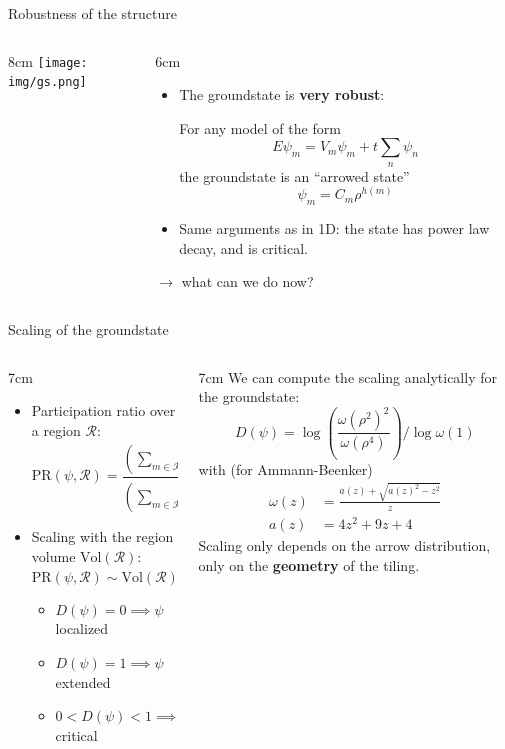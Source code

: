 \documentclass[xcolor=x11names,compress,professionalfonts, aspectratio=169]{beamer}
\renewcommand{\(}{\begin{columns}}
\renewcommand{\)}{\end{columns}}
\newcommand{\<}[1]{\begin{column}{#1}}
\renewcommand{\>}{\end{column}}
\begin{document}
\begin{frame}{Robustness of the structure}

\begin{columns}
\<{8cm}
\texttt{[image: img/gs.png]}
\>
\<{6cm}
\begin{itemize}
\item The groundstate is \textbf{very robust}: 

For any model of the form
\[
	E \psi_m = V_m \psi_m + t\sum_{n} \psi_n
\]
the groundstate is an ``arrowed state''
\[
  \psi_m = C_m \rho^{h(m)}
\]
\item Same arguments as in 1D: the state has power law decay, and is critical.
\end{itemize}
$\rightarrow$ what can we do now?
\>
\end{columns}
\end{frame}

\begin{frame}{Scaling of the groundstate}

\begin{columns}
\<{7cm}
\begin{itemize}
	\item Participation ratio over a region $\mathcal{R}$:
	\[
		\text{PR}(\psi, \mathcal{R}) = \frac{\left( \sum_{m \in \mathcal{R}}|\psi_m|^2 \right)^2}{\left( \sum_{m\in \mathcal{R}} |\psi_m|^4 \right)^4}
	\]
	\item Scaling with the region volume $\text{Vol}(\mathcal{R})$:
	\[
		\text{PR}(\psi, \mathcal{R}) \sim \text{Vol}(\mathcal{R})^{D(\psi)}
	\]
	\begin{itemize}
		\item $D(\psi) = 0 \implies \psi$ localized
		\item $D(\psi) = 1 \implies \psi$ extended
		\item $0 < D(\psi) < 1 \implies \psi$ critical
 	\end{itemize}
\end{itemize}
\>

\<{7cm}
We can compute the scaling analytically for the groundstate:
\[
\boxed{
D(\psi) = \log\left( \frac{\omega(\rho^2)^2}{\omega(\rho^4)}\right)/\log \omega(1)
}
\]
with (for Ammann-Beenker)
\begin{align*}
\omega(z) &= \frac{a(z)+\sqrt{a(z)^2 - z^2}}{z} \\
a(z) &= 4 z^2 + 9 z + 4
\end{align*}
Scaling only depends on the arrow distribution, only on the \textbf{geometry} of the tiling.
\>
\end{columns}
\end{frame}
\end{document}
